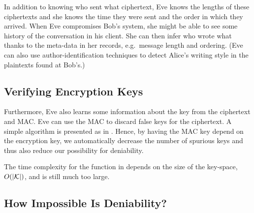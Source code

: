 {In addition to knowing who sent what ciphertext, Eve knows the lengths of these 
ciphertexts and she knows the time they were sent and the order in which they 
arrived.
When Eve compromises Bob's system, she might be able to see some history of the 
conversation in his client.
She can then infer who wrote what thanks to the meta-data in her records, 
e.g.~message length and ordering.
(Eve can also use author-identification techniques to detect Alice's writing 
style in the plaintexts found at Bob's.)

\subsection{Verifying Encryption Keys}

Furthermore, Eve also learns some information about the key from the ciphertext 
and \ac{MAC}.
Eve can use the \ac{MAC} to discard false keys for the ciphertext.
A simple algorithm is presented as  in 
.
Hence, by having the \ac{MAC} key depend on the encryption key, we 
automatically decrease the number of spurious keys and thus also reduce our 
possibility for deniability.

\begin{algorithm}
  \caption{%
    Algorithm for finding possible plaintexts and discarding false keys.
  }\label{alg:falsekeys}
  \begin{algorithmic}
      \EndIf{}
    \EndFunction{}

    \Statex{}
        \EndIf{}
      \EndFor{}
    \EndFunction{}
  \end{algorithmic}
\end{algorithm}

The time complexity for the function  in  
depends on the size of the key-space, \(O(|\mathcal K|)\), and is still much too 
large.

\subsection{How Impossible Is Deniability?}

}
